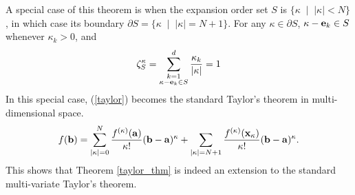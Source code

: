 A special case of this theorem is when the expansion order set $S$ is
$ \{ \kappa \;\mid\; |\kappa| < N \} $, in which case its boundary
$ \partial S = \{ \kappa \;\mid\; |\kappa| = N+1 \} $.
For any $\kappa \in \partial S$, $\kappa-\mathbf{e}_k \in S$ whenever $\kappa_k>0$,
and
\[ \zeta^\kappa_S = \sum_{\substack{k=1\\ \kappa-\mathbf{e}_k\in S}}^d
   \frac{\kappa_k}{|\kappa|} = 1 \]
In this special case, (\ref{taylor}) becomes the standard Taylor's theorem in
multi-dimensional space.
\[ f(\mathbf{b}) = \sum_{|\kappa|=0}^N \frac{f^{(\kappa)}(\mathbf{a})}{\kappa!} (\mathbf{b}-\mathbf{a})^\kappa
      + \sum_{|\kappa|=N+1} 
        \frac{f^{(\kappa)}(\mathbf{x}_\kappa)}{\kappa!} (\mathbf{b}-\mathbf{a})^\kappa . \]
This shows that Theorem \ref{taylor_thm} is indeed an extension to the standard
multi-variate Taylor's theorem.



